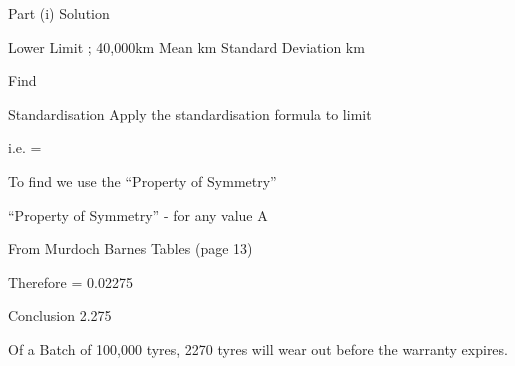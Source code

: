 \documentclass[a4]{beamer}
\begin{document}
Part (i) Solution

Lower Limit ; 40,000km			Mean		 km	
						Standard Deviation	 km

Find  

Standardisation
Apply the standardisation formula	 	to limit
 

i.e.  = 

To find   we use the “Property of Symmetry”

“Property of Symmetry” -   for any value A
	 

From Murdoch Barnes Tables (page 13)  

Therefore   = 0.02275 

Conclusion
2.275%

Of a Batch of 100,000 tyres,  2270 tyres will wear out before the warranty expires.
	
\end{document}
